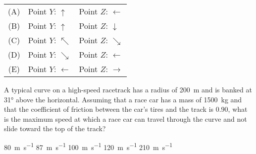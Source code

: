 \documentclass{../../oss-apphys-exam}
\begin{document}
\begin{multicols*}{2}
\begin{questions}
    \begin{tabular}{cll}
      (A) & Point $Y$: {\LARGE $\uparrow$} & Point $Z$: {\LARGE $\leftarrow$}\\
      (B) & Point $Y$: {\LARGE $\uparrow$} & Point $Z$: {\LARGE $\downarrow$}\\
      (C) & Point $Y$: {\LARGE $\nwarrow$} & Point $Z$: {\LARGE $\searrow$}\\
      (D) & Point $Y$: {\LARGE $\searrow$} & Point $Z$: {\LARGE $\leftarrow$}\\
      (E) & Point $Y$: {\LARGE $\leftarrow$}&Point $Z$: {\LARGE $\rightarrow$}\\
    \end{tabular}
    \vspace{.7in}
    
    \question A typical curve on a high-speed racetrack has a radius of
    \SI{200}{\metre} and is banked at \ang{31} above the horizontal. Assuming
    that a race car has a mass of \SI{1500}{\kilo\gram} and that the
    coefficient of friction between the car's tires and the track is 0.90, what
    is the maximum speed at which a race car can travel through the curve and
    not slide toward the top of the track?
    \begin{choices}
      \choice\SI{80}{\metre\per\second}
      \choice\SI{87}{\metre\per\second}
      \choice\SI{100}{\metre\per\second}
      \choice\SI{120}{\metre\per\second}
      \choice\SI{210}{\metre\per\second}
    \end{choices}
    \columnbreak        

    
    \columnbreak
    
    

\end{questions}
\end{multicols*}
\end{document}
